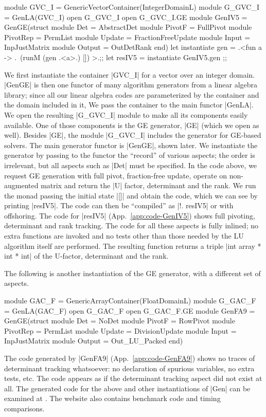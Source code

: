 \documentclass{elsart}
\begin{document}
\begin{code}
module GVC_I = GenericVectorContainer(IntegerDomainL)
module G_GVC_I = GenLA(GVC_I)
open G_GVC_I
open G_GVC_I.GE
module GenIV5 = GenGE(struct 
    module Det = AbstractDet
    module PivotF = FullPivot
    module PivotRep = PermList
    module Update = FractionFreeUpdate
    module Input = InpJustMatrix
    module Output = OutDetRank end)
let instantiate gen =
    .<fun a -> .~(runM (gen .<a>.) []) >.;;
let resIV5 = instantiate GenIV5.gen ;;
\end{code}
%
We first instantiate the container |GVC_I| for a vector over an
integer domain.  |GenGE| is then one functor of many algorithm
generators from a linear algebra library; since all our linear algebra codes
are parameterized by the container and the domain included in it,
We pass the container to the main functor |GenLA|.
We open the resulting |G_GVC_I| module
to make all its components easily available. One of those components
is the GE generator, |GE| (which we open as well). Besides |GE|, the
module |G_GVC_I| includes the generator for GE-based solvers.  The main
generator functor is |GenGE|, shown later.  We instantiate the
generator by passing to the functor the ``record'' of various aspects; the
order is irrelevant, but all aspects such as |Det| must be
specified. In the code above, we request GE generation with full
pivot, fraction-free update, operate on non-augmented matrix and
return the |U| factor, determinant and the rank. We run the monad
passing the initial state |[]| and obtain the code, which we can see
by printing |resIV5|. The code can then be ``compiled'' as |!. resIV5|
or with offshoring\cite{offshoring}. The code for |resIV5|
(App.~\ref{app:code-GenIV5}) shows full
pivoting, determinant and rank tracking. The code for all these
aspects is fully inlined; no extra functions are invoked and no tests
other than those needed by the LU algorithm itself are performed. The
resulting function returns a triple |int array * int * int| of the
U-factor, determinant and the rank.

The following is another instantiation of the GE generator, with a
different set of aspects.
\begin{code}
module GAC_F = GenericArrayContainer(FloatDomainL)
module G_GAC_F = GenLA(GAC_F)
open G_GAC_F
open G_GAC_F.GE
module GenFA9 = GenGE(struct 
    module Det = NoDet
    module PivotF = RowPivot
    module PivotRep = PermList
    module Update = DivisionUpdate
    module Input = InpJustMatrix
    module Output = Out_LU_Packed end)
\end{code}
The code generated by |GenFA9| (App.~\ref{app:code-GenFA9}) shows no traces of
determinant tracking whatsoever: no declaration of spurious variables,
no extra tests, etc. The code appears as if the determinant tracking
aspect did not exist at all. The generated code for the above and
other instantiations of |Gen| can be examined at
\cite{metamonadsURL}. The website also contains benchmark code and
timing comparisons.
\end{document}
